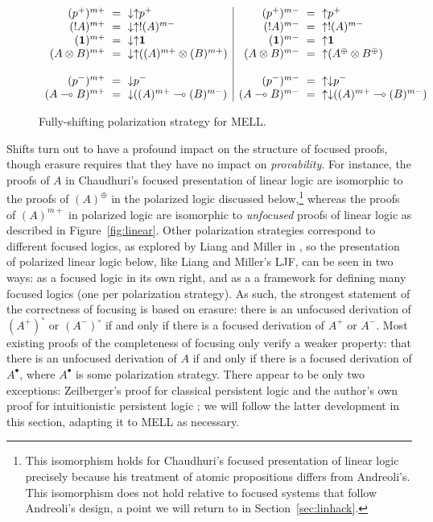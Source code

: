 \begin{figure}
{\small \[
\begin{array}{rcl|rcl}
(p^+)^{m+} & \!\!\!=\!\!\! & {\downarrow}{\uparrow}p^+ &
(p^+)^{m-} & \!\!\!=\!\!\! & {\uparrow}p^+
\\
({!}A)^{m+} & \!\!\!=\!\!\! & {\downarrow}{\uparrow}{!}(A)^{m-} &
({!}A)^{m-} & \!\!\!=\!\!\! & {\uparrow}{!}(A)^{m-}
\\
(\one)^{m+} & \!\!\!=\!\!\! & {\downarrow}{\uparrow}\one &
(\one)^{m-} & \!\!\!=\!\!\! & {\uparrow}\one 
\\
(A \otimes B)^{m+} & \!\!\!=\!\!\!
    & {\downarrow}{\uparrow}((A)^{m+} \otimes (B)^{m+}) &
(A \otimes B)^{m-} & \!\!\!=\!\!\! & {\uparrow}(A^\oplus \otimes B^\oplus)
\\
& & & & & 
\\
(p^-)^{m+} & \!\!\!=\!\!\! & {\downarrow}p^- &
(p^-)^{m-} & \!\!\!=\!\!\! & {\uparrow}{\downarrow}p^- 
\\
(A \lolli B)^{m+} & \!\!\!=\!\!\! & {\downarrow}((A)^{m+} \lolli (B)^{m-}) &
(A \lolli B)^{m-} & \!\!\!=\!\!\!
     & {\uparrow}{\downarrow}((A)^{m+} \lolli (B)^{m-})
\end{array}
\]}

\caption{Fully-shifting polarization strategy for MELL.}
\label{fig:lin-maxshift}
\end{figure}

Shifts turn out to have a profound impact on the structure of focused
proofs, though erasure requires that they have no impact on {\it
  provability}. For instance, the proofs of $A$ in Chaudhuri's focused
presentation of linear logic are isomorphic to the proofs of
$(A)^\oplus$ in the polarized logic discussed below,\footnote{This
  isomorphism holds for Chaudhuri's focused presentation of linear
  logic precisely because his treatment of atomic propositions differs
  from Andreoli's. This isomorphism does not hold relative to focused
  systems that follow Andreoli's design, a point we will return to in
  Section~\ref{sec:linhack}.} whereas the proofs of $(A)^{m+}$ in
polarized logic are isomorphic to {\it unfocused} proofs of linear
logic as described in Figure~\ref{fig:linear}. Other polarization
strategies correspond to different focused logics, as explored by
Liang and Miller in \cite{liang09focusing}, so the presentation of
polarized linear logic below, like Liang and Miller's LJF, can be seen
in two ways: as a focused logic in its own right, and as a a framework
for defining many focused logics (one per polarization strategy). As
such, the strongest statement of the correctness of focusing is based
on erasure: there is an unfocused derivation of $(A^+)^\circ$ or
$(A^-)^\circ$ if and only if there is a focused derivation of $A^+$ or
$A^-$.  Most existing proofs of the completeness of focusing only
verify a weaker property: that there is an unfocused derivation of $A$
if and only if there is a focused derivation of $A^\bullet$, where
$A^\bullet$ is some polarization strategy.  There appear to be only
two exceptions: Zeilberger's proof for classical persistent logic
\cite{zeilberger08unity} and the author's own proof for intuitionistic
persistent logic \cite{simmons11structural}; we will follow the latter
development in this section, adapting it to MELL as necessary.


